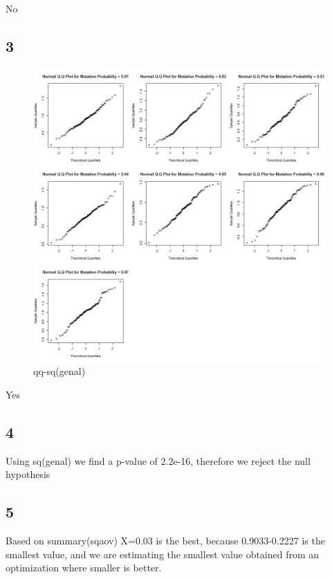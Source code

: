 \documentclass{article}
\begin{document}
    No
    \subsection*{3}
    \begin{figure}[!htb]
      \includegraphics[scale=0.4]{../results/3_3.png}
      \caption{qq-sq(genal)}
      \label{fig:qq-sqgenal}
    \end{figure}
    
    Yes
    \subsection*{4}
    
    Using sq(genal) we find a p-value of 2.2e-16, therefore we reject the null hypothesis
    \subsection*{5}
    Based on summary(sqaov) X=0.03 is the best, because 0.9033-0.2227 is the smallest value, and we are estimating the smallest value obtained from an optimization where smaller is better.
\end{document}
